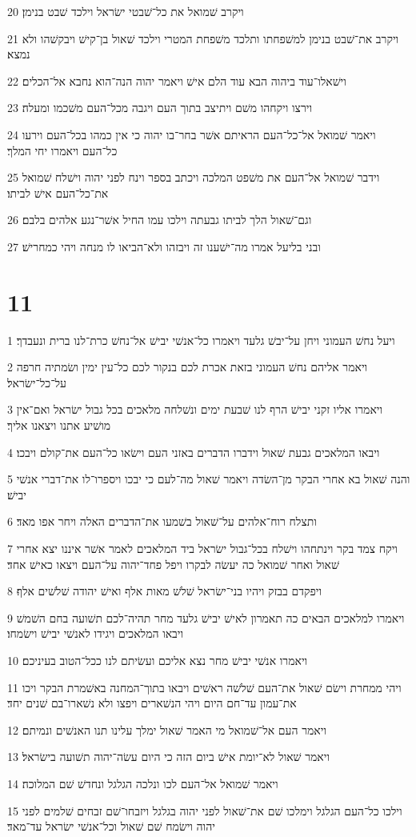 \par 20 ויקרב שׁמואל את כל־שׁבטי ישׂראל וילכד שׁבט בנימן׃
\par 21 ויקרב את־שׁבט בנימן למשׁפחתו ותלכד משׁפחת המטרי וילכד שׁאול בן־קישׁ ויבקשׁהו ולא נמצא׃
\par 22 וישׁאלו־עוד ביהוה הבא עוד הלם אישׁ ויאמר יהוה הנה־הוא נחבא אל־הכלים׃
\par 23 וירצו ויקחהו משׁם ויתיצב בתוך העם ויגבה מכל־העם משׁכמו ומעלה׃
\par 24 ויאמר שׁמואל אל־כל־העם הראיתם אשׁר בחר־בו יהוה כי אין כמהו בכל־העם וירעו כל־העם ויאמרו יחי המלך׃
\par 25 וידבר שׁמואל אל־העם את משׁפט המלכה ויכתב בספר וינח לפני יהוה וישׁלח שׁמואל את־כל־העם אישׁ לביתו׃
\par 26 וגם־שׁאול הלך לביתו גבעתה וילכו עמו החיל אשׁר־נגע אלהים בלבם׃
\par 27 ובני בליעל אמרו מה־ישׁענו זה ויבזהו ולא־הביאו לו מנחה ויהי כמחרישׁ׃

\chapter{11}

\par 1 ויעל נחשׁ העמוני ויחן על־יבשׁ גלעד ויאמרו כל־אנשׁי יבישׁ אל־נחשׁ כרת־לנו ברית ונעבדך׃
\par 2 ויאמר אליהם נחשׁ העמוני בזאת אכרת לכם בנקור לכם כל־עין ימין ושׂמתיה חרפה על־כל־ישׂראל׃
\par 3 ויאמרו אליו זקני יבישׁ הרף לנו שׁבעת ימים ונשׁלחה מלאכים בכל גבול ישׂראל ואם־אין מושׁיע אתנו ויצאנו אליך׃
\par 4 ויבאו המלאכים גבעת שׁאול וידברו הדברים באזני העם וישׂאו כל־העם את־קולם ויבכו׃
\par 5 והנה שׁאול בא אחרי הבקר מן־השׂדה ויאמר שׁאול מה־לעם כי יבכו ויספרו־לו את־דברי אנשׁי יבישׁ׃
\par 6 ותצלח רוח־אלהים על־שׁאול בשׁמעו את־הדברים האלה ויחר אפו מאד׃
\par 7 ויקח צמד בקר וינתחהו וישׁלח בכל־גבול ישׂראל ביד המלאכים לאמר אשׁר איננו יצא אחרי שׁאול ואחר שׁמואל כה יעשׂה לבקרו ויפל פחד־יהוה על־העם ויצאו כאישׁ אחד׃
\par 8 ויפקדם בבזק ויהיו בני־ישׂראל שׁלשׁ מאות אלף ואישׁ יהודה שׁלשׁים אלף׃
\par 9 ויאמרו למלאכים הבאים כה תאמרון לאישׁ יבישׁ גלעד מחר תהיה־לכם תשׁועה בחם השׁמשׁ ויבאו המלאכים ויגידו לאנשׁי יבישׁ וישׂמחו׃
\par 10 ויאמרו אנשׁי יבישׁ מחר נצא אליכם ועשׂיתם לנו ככל־הטוב בעיניכם׃
\par 11 ויהי ממחרת וישׂם שׁאול את־העם שׁלשׁה ראשׁים ויבאו בתוך־המחנה באשׁמרת הבקר ויכו את־עמון עד־חם היום ויהי הנשׁארים ויפצו ולא נשׁארו־בם שׁנים יחד׃
\par 12 ויאמר העם אל־שׁמואל מי האמר שׁאול ימלך עלינו תנו האנשׁים ונמיתם׃
\par 13 ויאמר שׁאול לא־יומת אישׁ ביום הזה כי היום עשׂה־יהוה תשׁועה בישׂראל׃
\par 14 ויאמר שׁמואל אל־העם לכו ונלכה הגלגל ונחדשׁ שׁם המלוכה׃
\par 15 וילכו כל־העם הגלגל וימלכו שׁם את־שׁאול לפני יהוה בגלגל ויזבחו־שׁם זבחים שׁלמים לפני יהוה וישׂמח שׁם שׁאול וכל־אנשׁי ישׂראל עד־מאד׃

